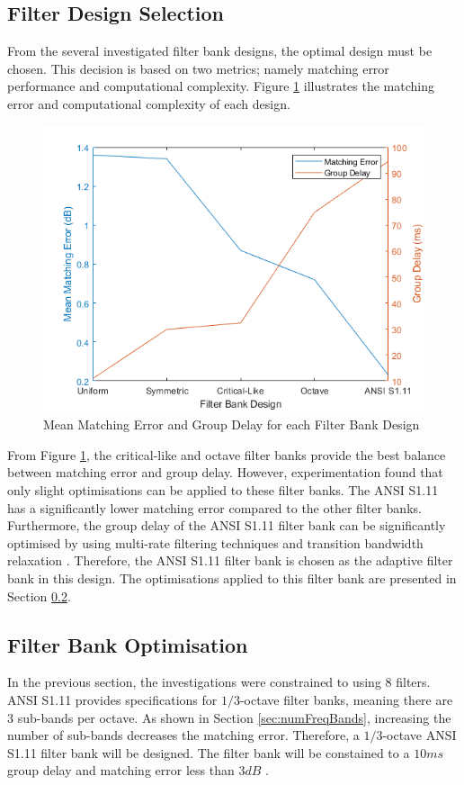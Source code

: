 \documentclass[12pt, onecolumn]{article}
\begin{document}
\subsection{Filter Design Selection}

\noindent From the several investigated filter bank designs, the optimal design must be chosen. This decision is based on two metrics; namely matching error performance and computational complexity. Figure \ref{fig:matErrDelay} illustrates the matching error and computational complexity of each design.

\begin{figure}[h]
\centering
\includegraphics[width=0.6\linewidth]{matErrDelay.PNG}
\caption{Mean Matching Error and Group Delay for each Filter Bank Design}
\label{fig:matErrDelay}
\end{figure}

\noindent From Figure \ref{fig:matErrDelay}, the critical-like and octave filter banks provide the best balance between matching error and group delay. However, experimentation found that only slight optimisations can be applied to these filter banks. The ANSI S1.11 has a significantly lower matching error compared to the other filter banks. Furthermore, the group delay of the ANSI S1.11 filter bank can be significantly optimised by using multi-rate filtering techniques and transition bandwidth relaxation \cite{chang}. Therefore, the ANSI S1.11 filter bank is chosen as the adaptive filter bank in this design. The optimisations applied to this filter bank are presented in Section \ref{sec:filtBankOpt}.

\subsection{Filter Bank Optimisation}
\label{sec:filtBankOpt}

\noindent In the previous section, the investigations were constrained to using 8 filters. ANSI S1.11 provides specifications for $1/3$-octave filter banks, meaning there are $3$ sub-bands per octave. As shown in Section \ref{sec:numFreqBands}, increasing the number of sub-bands decreases the matching error. Therefore, a $1/3$-octave ANSI S1.11 filter bank will be designed. The filter bank will be constained to a $10ms$ group delay and matching error less than $3dB$ \cite{chang}.
\end{document}
